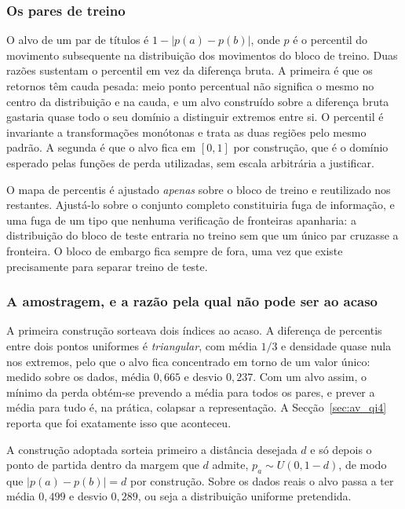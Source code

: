 \subsubsection*{Os pares de treino}

O alvo de um par de títulos é $1 - |p(a) - p(b)|$, onde $p$ é o percentil do movimento
subsequente na distribuição dos movimentos do bloco de treino. Duas razões sustentam o percentil
em vez da diferença bruta. A primeira é que os retornos têm cauda pesada: meio ponto percentual
não significa o mesmo no centro da distribuição e na cauda, e um alvo construído sobre a
diferença bruta gastaria quase todo o seu domínio a distinguir extremos entre si. O percentil é
invariante a transformações monótonas e trata as duas regiões pelo mesmo padrão. A segunda é que
o alvo fica em $[0, 1]$ por construção, que é o domínio esperado pelas funções de perda
utilizadas, sem escala arbitrária a justificar.

O mapa de percentis é ajustado \emph{apenas} sobre o bloco de treino e reutilizado nos restantes.
Ajustá-lo sobre o conjunto completo constituiria fuga de informação, e uma fuga de um tipo que
nenhuma verificação de fronteiras apanharia: a distribuição do bloco de teste entraria no treino
sem que um único par cruzasse a fronteira. O bloco de embargo fica sempre de fora, uma vez que
existe precisamente para separar treino de teste.

\subsubsection*{A amostragem, e a razão pela qual não pode ser ao acaso}

A primeira construção sorteava dois índices ao acaso. A diferença de percentis entre dois pontos
uniformes é \emph{triangular}, com média $1/3$ e densidade quase nula nos extremos, pelo que o
alvo fica concentrado em torno de um valor único: medido sobre os dados, média $0{,}665$ e desvio
$0{,}237$. Com um alvo assim, o mínimo da perda obtém-se prevendo a média para todos os pares, e
prever a média para tudo é, na prática, colapsar a representação. A
Secção~\ref{sec:av_qi4} reporta que foi exatamente isso que aconteceu.

A construção adoptada sorteia primeiro a distância desejada $d$ e só depois o ponto de partida
dentro da margem que $d$ admite, $p_a \sim U(0, 1-d)$, de modo que $|p(a) - p(b)| = d$ por
construção. Sobre os dados reais o alvo passa a ter média $0{,}499$ e desvio $0{,}289$, ou seja a
distribuição uniforme pretendida.

